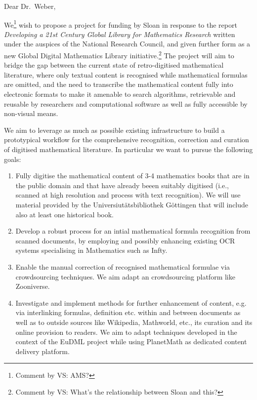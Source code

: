 \documentclass{article}
\def\comment#1#2{\typeout{Comment!}\footnote{Comment by #1: #2}}
\begin{document}

Dear Dr.~Weber,

We\comment{VS}{AMS?} wish to propose a project for funding by Sloan in response
to the report \emph{Developing a 21st Century Global Library for Mathematics
  Research} written under the auspices of the National Research Council, and
given further form as a new Global Digital Mathematics Library
initiative.\comment{VS}{What's the relationship between Sloan and this?} The
project will aim to bridge the gap between the current state of retro-digitised
mathematical literature, where only textual content is recognised while
mathematical formulas are omitted, and the need to transcribe the mathematical
content fully into electronic formats to make it amenable to search algorithms,
retrievable and reusable by researchers and computational software as well as
fully accessible by non-visual means.

We aim to leverage as much as possible existing infrastructure to build a
prototypical workflow for the comprehensive recognition, correction and curation
of digitised mathematical literature. In particular we want to pursue the
following goals:
\begin{enumerate}
\item Fully digitise the mathematical content of 3-4 mathematics books that are
  in the public domain and that have already beeen suitably digitised (i.e.,
  scanned at high resolution and process with text recognition). We will use
  material provided by the Universiut{\"a}tsbibliothek G{\"o}ttingen that will
  include also at least one historical book.
\item Develop a robust process for an intial mathematical formula recognition
  from scanned documents, by employing and possibly enhancing existing OCR
  systems specialising in Mathematics such as Infty.
\item Enable the manual correction of recognised mathematical formulae via
  crowdsourcing techniques. We aim adapt an crowdsourcing platform like
  Zooniverse.
\item Investigate and implement methods for further enhancement of content,
  e.g. via interlinking formulas, definition etc. within and between documents
  as well as to outside sources like Wikipedia, Mathworld, etc., its curation
  and its online provision to readers. We aim to adapt techniques developed in
  the context of the EuDML project while using PlanetMath as dedicated content
  delivery platform.
\end{enumerate}
\end{document}
